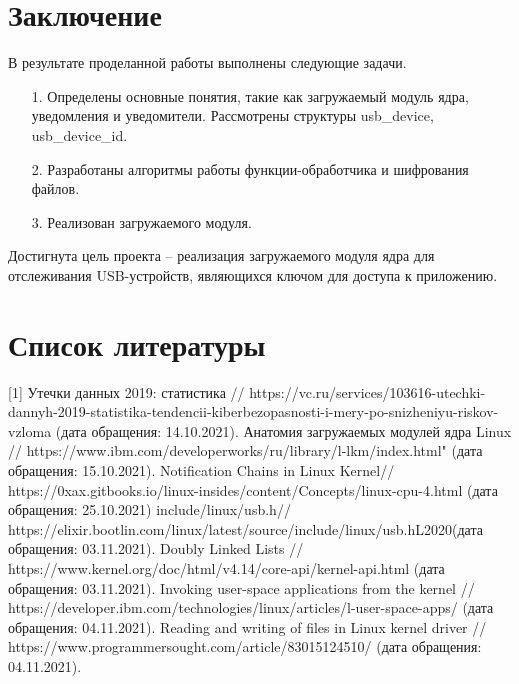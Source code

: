 \documentclass[a4paper, 10pt]{article}
\begin{document}
\section*{Заключение}
	В результате проделанной работы выполнены следующие задачи.
	\begin{enumerate}
		\item[1. ] Определены основные понятия, такие как загружаемый модуль ядра, уведомления и уведомители. Рассмотрены структуры usb\_device, usb\_device\_id. 
		\item[2. ] Разработаны алгоритмы работы функции-обработчика и шифрования файлов. 
		\item[3. ] Реализован загружаемого модуля. 
	\end{enumerate}
	
	Достигнута цель проекта -- реализация загружаемого модуля ядра для отслеживания USB-устройств, являющихся ключом для доступа к приложению. 
\clearpage
\newpage

\section*{Список литературы}
[1] \hspace{2mm} Утечки данных 2019: статистика // https://vc.ru/services/103616-utechki-dannyh-2019-statistika-tendencii-kiberbezopasnosti-i-mery-po-snizheniyu-riskov-vzloma (дата обращения: 14.10.2021).\vspace{3mm}
\newline [2]\hspace{2mm} Анатомия загружаемых модулей ядра Linux // https://www.ibm.com/developerworks/ru/library/l-lkm/index.html" (дата обращения: 15.10.2021).\vspace{3mm}
\newline [3]\hspace{2mm} Notification Chains in Linux Kernel// https://0xax.gitbooks.io/linux-insides/content/Concepts/linux-cpu-4.html (дата обращения: 25.10.2021)\vspace{3mm} 
\newline [4]\hspace{2mm} include/linux/usb.h// https://elixir.bootlin.com/linux/latest/source/include/linux/usb.hL2020(дата обращения: 03.11.2021).\vspace{3mm}
\newline [5]\hspace{2mm} Doubly Linked Lists // https://www.kernel.org/doc/html/v4.14/core-api/kernel-api.html (дата обращения: 03.11.2021).\vspace{3mm}
\newline [6]\hspace{2mm} Invoking user-space applications from the kernel // https://developer.ibm.com/technologies/linux/articles/l-user-space-apps/ (дата обращения: 04.11.2021).\vspace{3mm}
\newline [7]\hspace{2mm} Reading and writing of files in Linux kernel driver // https://www.programmersought.com/article/83015124510/ (дата обращения: 04.11.2021).\vspace{3mm}
\end{document}
